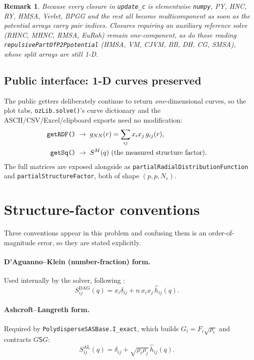 \documentclass[11pt,a4paper]{article}
\newcommand{\code}[1]{\texttt{\hspace{0pt}#1}}
\newtheorem{remark}{Remark}
\begin{document}
\begin{remark}
Because every closure in \code{update\_c} is elementwise \code{numpy}, PY,
HNC, RY, HMSA, Verlet, BPGG and the rest all become multicomponent as soon as
the potential arrays carry pair indices. Closures requiring an auxiliary
reference solve (RHNC, MHNC, RMSA, EuRah) remain one-component, as do those
reading \code{repulsivePartOfP2Ppotential} (HMSA, VM, CJVM, BB, DH, CG,
SMSA), whose split arrays are still 1-D.
\end{remark}

\subsection{Public interface: 1-D curves preserved}

The public getters deliberately continue to return \emph{one}-dimensional
curves, so the plot tabs, \code{ozLib.solve()}'s curve dictionary and the
ASCII/CSV/Excel/clipboard exports need no modification:
\begin{align}
\code{getRDF()} &\;\rightarrow\; g_{NN}(r)=\sum_{ij}x_ix_j\,g_{ij}(r),\\
\code{getSq()}  &\;\rightarrow\; S^{M}(q) \text{ (the measured structure factor)}.
\end{align}
The full matrices are exposed alongside as
\code{partialRadialDistributionFunction} and
\code{partialStructureFactor}, both of shape $(p,p,N_r)$.

\section{Structure-factor conventions}
\label{sec:conventions}

Three conventions appear in this problem and confusing them is an
order-of-magnitude error, so they are stated explicitly.

\paragraph{D'Aguanno--Klein (number-fraction) form.} Used internally by the
solver, following \cite{DAguannoKlein1991}:
\begin{equation}
S^{\mathrm{DAG}}_{ij}(q) = x_i\delta_{ij} + n\,x_i x_j\,\hat h_{ij}(q).
\end{equation}

\paragraph{Ashcroft--Langreth form.} Required by
\code{PolydisperseSASBase.I\_exact}, which builds
$G_i=F_i\sqrt{\rho_i}$ and contracts $G\mathsf{S}G$:
\begin{equation}
S^{\mathrm{AL}}_{ij}(q) = \delta_{ij} + \sqrt{\rho_i\rho_j}\,\hat h_{ij}(q).
\end{equation}
\end{document}
